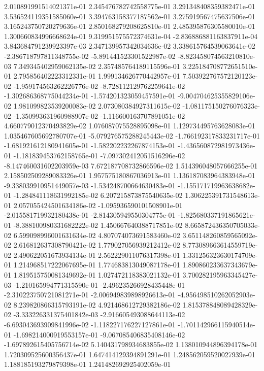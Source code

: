 2.010891991514021371e-01
2.345476782742558775e-01
3.291348408359382471e-01
3.536524119351585060e-01
3.394763158377187562e-01
3.275919567475637506e-01
3.165243750720279636e-01
2.850168279208625810e-01
2.485395876305580010e-01
1.300660834996668624e-01
9.319951575572374631e-04
-2.836886881163837911e-04
3.843684791239923397e-03
2.347139957342034636e-02
3.338615764539063641e-02
-2.386718797811348755e-02
-5.891441523301522987e-02
-8.823458074563210810e-03
7.349345402959062135e-02
2.357485764189115596e-01
3.225184708772651510e-01
2.795856402223312331e-01
1.999134626770442957e-01
7.503922767572120123e-02
-1.959174563262226776e-02
-8.728112129762259641e-02
-1.302686368775044234e-01
-1.574201323059457591e-01
-9.004704625355829106e-02
1.981099823539200083e-02
2.073080384927311615e-02
-1.081175150276076323e-02
-1.350993631960988907e-02
-1.116600163707891051e-02
4.660779012370493829e-02
1.076087075528895098e-01
1.129734495763628083e-01
1.035467605692780707e-01
-5.079276575288245443e-02
-1.766192317833231717e-01
-1.681921612180941605e-01
-1.582202232267874153e-01
-1.436560872981973436e-01
-1.181839453762158765e-01
-7.097302412051516296e-02
-8.147460031602203959e-03
7.672187708732866596e-02
1.514396048057666255e-01
2.158502509289083326e-01
1.957575180867036913e-01
1.136187083964383948e-01
-9.338039910951449057e-03
-1.534248700664630483e-01
-1.155171719963638682e-01
-1.284841118631992185e-02
6.207215873875540635e-02
1.306225391731548613e-01
2.057055424501634186e-02
-1.095936590101508901e-01
-2.015581719932180438e-01
-2.814305949550304775e-01
-1.825680337191865621e-01
-8.388100980331682222e-02
1.450667640388717851e-02
8.665872436350705033e-02
6.599098996001631634e-02
4.807074073691583460e-02
3.651148260859565092e-02
2.616812637308790421e-02
1.779027056939212412e-02
8.773089663614559719e-02
2.490622051673934134e-01
2.562229011076317398e-01
1.331256323630174709e-01
1.214968517222067695e-01
1.774683813049087178e-01
1.890860233637343679e-01
1.819515750081349692e-01
1.027472118383021132e-01
3.700282195963345427e-03
-1.210165994771315590e-01
-2.496235266928435448e-01
-2.310223750721081271e-01
-2.006949839898926613e-01
-4.956498510262052903e-02
8.239820866315793191e-02
4.921468612729382186e-02
1.815378848089428329e-02
-3.333226331375401842e-03
-2.916605493088644113e-02
-6.693043693909841996e-02
-1.118227176227127861e-01
-1.701142966115940514e-01
-1.698214000919553157e-01
-9.067085406835408146e-02
-1.697892615405756714e-02
5.140431798934683855e-02
1.138010944896394178e-01
1.720309525600356437e-01
1.647414129394891291e-01
1.248562059520027939e-01
1.188185193279879398e-01
1.241482692925402059e-01
